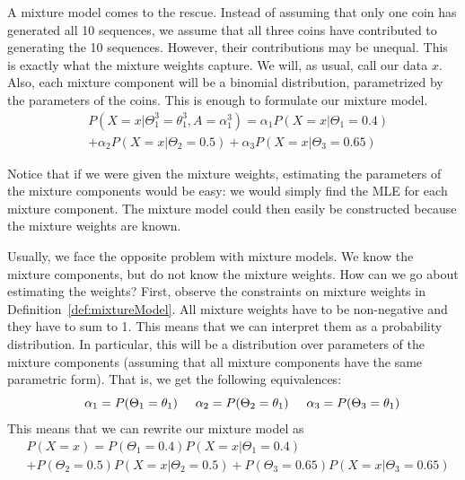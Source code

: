 A mixture model comes to the rescue. Instead of assuming that only one coin has generated all 10 sequences,
we assume that all three coins have contributed to generating the 10 sequences. However, their contributions
may be unequal. This is exactly what the mixture weights capture. We will, as usual, call our data
$ x $. Also, each mixture component will be a binomial distribution, parametrized by the parameters of
the coins. This is enough to formulate our mixture model.
\begin{align}\label{eq:mixtureExample}
&P(X=x|\Theta_{1}^{3}=\theta_{1}^{3}, A = \alpha_{1}^{3}) 
= \alpha_{1}P(X=x|\Theta_{1}=0.4) \\
&+ \alpha_{2}P(X=x|\Theta_{2}=0.5) + \alpha_{3}P(X=x|\Theta_{3}=0.65) \nonumber
\end{align}

Notice that if we were given the mixture weights, estimating
the parameters of the mixture components would be easy: we would simply find the MLE for each mixture component. The mixture
model could then easily be constructed because the mixture weights are known. 

Usually, we face the opposite problem with mixture models. We know the mixture components, but do not know the mixture weights.
How can we go about estimating the weights? First, observe the constraints
on mixture weights in Definition~\ref{def:mixtureModel}. All mixture weights have to be non-negative and they have to sum to 1.
This means that we can interpret them as a probability distribution. In particular, this will be a distribution over parameters
of the mixture components (assuming that all mixture components have the same parametric form). That is, we get the following
equivalences:
\begin{equation}
\hskip 0.5cm \alpha_{1} = P(\Theta_{1} = \theta_{1}) \hskip 0.5cm \alpha_{2} = P(\Theta_{2} = \theta_{1}) \hskip 0.5cm \alpha_{3} = P(\Theta_{3} = \theta_{1})
\end{equation}
This means that we can rewrite our mixture model as
\begin{align} \label{eq:probabilisticMixtureModel}
&P(X=x) 
= P(\Theta_{1} = 0.4)P(X=x|\Theta_{1}=0.4) \\
&+ P(\Theta_{2} = 0.5)P(X=x|\Theta_{2}=0.5) + P(\Theta_{3} = 0.65)P(X=x|\Theta_{3}=0.65) \nonumber
\end{align}

